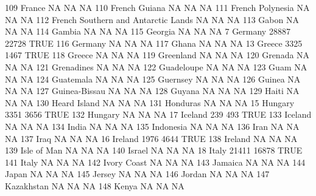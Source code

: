 \documentclass [a4paper] {article}
\begin{document}
\begin{Schunk}
\begin{Soutput}
109                              France    NA    NA   NA
110                       French Guiana    NA    NA   NA
111                    French Polynesia    NA    NA   NA
112 French Southern and Antarctic Lands    NA    NA   NA
113                               Gabon    NA    NA   NA
114                              Gambia    NA    NA   NA
115                             Georgia    NA    NA   NA
7                               Germany 28887 22728 TRUE
116                             Germany    NA    NA   NA
117                               Ghana    NA    NA   NA
13                               Greece  3325  1467 TRUE
118                              Greece    NA    NA   NA
119                           Greenland    NA    NA   NA
120                             Grenada    NA    NA   NA
121                          Grenadines    NA    NA   NA
122                          Guadeloupe    NA    NA   NA
123                                Guam    NA    NA   NA
124                           Guatemala    NA    NA   NA
125                            Guernsey    NA    NA   NA
126                              Guinea    NA    NA   NA
127                       Guinea-Bissau    NA    NA   NA
128                              Guyana    NA    NA   NA
129                               Haiti    NA    NA   NA
130                        Heard Island    NA    NA   NA
131                            Honduras    NA    NA   NA
15                              Hungary  3351  3656 TRUE
132                             Hungary    NA    NA   NA
17                              Iceland   239   493 TRUE
133                             Iceland    NA    NA   NA
134                               India    NA    NA   NA
135                           Indonesia    NA    NA   NA
136                                Iran    NA    NA   NA
137                                Iraq    NA    NA   NA
16                              Ireland  1976  4644 TRUE
138                             Ireland    NA    NA   NA
139                         Isle of Man    NA    NA   NA
140                              Israel    NA    NA   NA
18                                Italy 21411 16878 TRUE
141                               Italy    NA    NA   NA
142                         Ivory Coast    NA    NA   NA
143                             Jamaica    NA    NA   NA
144                               Japan    NA    NA   NA
145                              Jersey    NA    NA   NA
146                              Jordan    NA    NA   NA
147                          Kazakhstan    NA    NA   NA
148                               Kenya    NA    NA   NA

\end{Soutput}
\end{Schunk}
\end{document}
